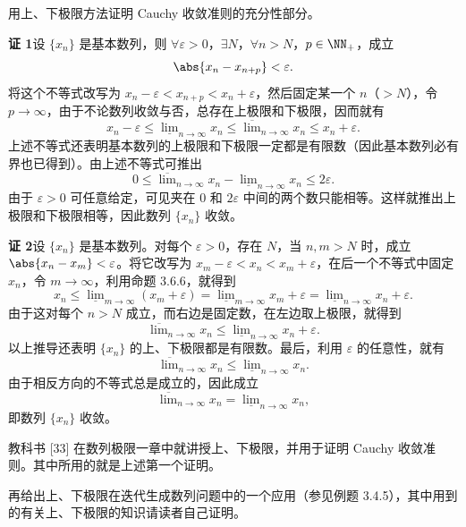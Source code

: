 \begin{xexample}[3.6.1]
用上、下极限方法证明 Cauchy 收敛准则的充分性部分。
\end{xexample}
\begin{xproof}
\textbf{证 1}\quad 设 $\{x_n\}$ 是基本数列，则 $\forall\varepsilon>0$，$\exists N$，$\forall n>N$，$p\in\NN_+$，成立
\[
  \abs{x_n-x_{n+p}}<\varepsilon.
\]
将这个不等式改写为 $x_n-\varepsilon<x_{n+p}<x_n+\varepsilon$，然后固定某一个 $n$（$>N$），令 $p\to\infty$，由于不论数列收敛与否，总存在上极限和下极限，因而就有
\[
  x_n-\varepsilon\leqslant\underline{\lim}_{n\to\infty}x_n
  \leqslant\overline{\lim}_{n\to\infty}x_n\leqslant x_n+\varepsilon.
\]
上述不等式还表明基本数列的上极限和下极限一定都是有限数（因此基本数列必有界也已得到）。由上述不等式可推出
\[
  0\leqslant\overline{\lim}_{n\to\infty}x_n
  -\underline{\lim}_{n\to\infty}x_n\leqslant2\varepsilon.
\]
由于 $\varepsilon>0$ 可任意给定，可见夹在 $0$ 和 $2\varepsilon$ 中间的两个数只能相等。这样就推出上极限和下极限相等，因此数列 $\{x_n\}$ 收敛。

\textbf{证 2}\quad 设 $\{x_n\}$ 是基本数列。对每个 $\varepsilon>0$，存在 $N$，当 $n,m>N$ 时，成立 $\abs{x_n-x_m}<\varepsilon$。将它改写为 $x_m-\varepsilon<x_n<x_m+\varepsilon$，在后一个不等式中固定 $x_n$，令 $m\to\infty$，利用命题 3.6.6，就得到
\[
  x_n\leqslant\underline{\lim}_{m\to\infty}(x_m+\varepsilon)
  =\underline{\lim}_{m\to\infty}x_m+\varepsilon
  =\underline{\lim}_{n\to\infty}x_n+\varepsilon.
\]
由于这对每个 $n>N$ 成立，而右边是固定数，在左边取上极限，就得到
\[
  \overline{\lim}_{n\to\infty}x_n
  \leqslant\underline{\lim}_{n\to\infty}x_n+\varepsilon.
\]
以上推导还表明 $\{x_n\}$ 的上、下极限都是有限数。最后，利用 $\varepsilon$ 的任意性，就有
\[
  \overline{\lim}_{n\to\infty}x_n
  \leqslant\underline{\lim}_{n\to\infty}x_n.
\]
由于相反方向的不等式总是成立的，因此成立
\[
  \overline{\lim}_{n\to\infty}x_n
  =\underline{\lim}_{n\to\infty}x_n,
\]
即数列 $\{x_n\}$ 收敛。
\end{xproof}

\begin{xremark}
教科书 [33] 在数列极限一章中就讲授上、下极限，并用于证明 Cauchy 收敛准则。其中所用的就是上述第一个证明。
\end{xremark}

再给出上、下极限在迭代生成数列问题中的一个应用（参见例题 3.4.5），其中用到的有关上、下极限的知识请读者自己证明。

